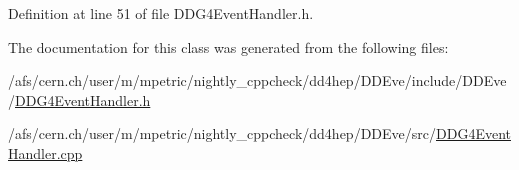 Definition at line 51 of file D\+D\+G4\+Event\+Handler.\+h.



The documentation for this class was generated from the following files\+:\begin{DoxyCompactItemize}
\item 
/afs/cern.\+ch/user/m/mpetric/nightly\+\_\+cppcheck/dd4hep/\+D\+D\+Eve/include/\+D\+D\+Eve/\hyperlink{_d_d_g4_event_handler_8h}{D\+D\+G4\+Event\+Handler.\+h}\item 
/afs/cern.\+ch/user/m/mpetric/nightly\+\_\+cppcheck/dd4hep/\+D\+D\+Eve/src/\hyperlink{_d_d_g4_event_handler_8cpp}{D\+D\+G4\+Event\+Handler.\+cpp}\end{DoxyCompactItemize}
